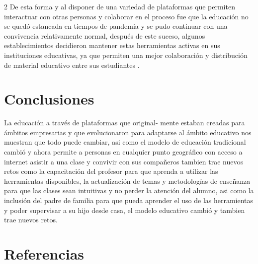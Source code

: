 \documentclass[12pt,spanish,Letterpaper,openany]{book}
\begin{document}
\begin {multicols}{2}
De esta forma y al disponer de una variedad de plataformas que permiten interactuar con
otras personas y colaborar en el proceso fue que la educación no se quedó estancada en
tiempos de pandemia y se pudo continuar con una convivencia relativamente normal, después
de este suceso, algunos establecimientos decidieron mantener estas herramientas activas en
sus instituciones educativas, ya que permiten una mejor colaboración y distribución de
material educativo entre sus estudiantes .

\hypertarget{conclusiones-7}{%
\section{Conclusiones}\label{conclusiones-7}}

La educación a través de plataformas que original-
mente estaban creadas para ámbitos
empresarias y que evolucionaron para adaptarse al ámbito educativo nos muestran que todo
puede cambiar, asi como el modelo de educación tradicional cambió y ahora permite a
personas en cualquier punto geográfico con acceso a internet asistir a una clase y convivir
con sus compañeros tambien trae nuevos retos como la capacitación del profesor para que
aprenda a utilizar las herramientas disponibles, la actualización de temas y metodologías de
enseñanza para que las clases sean intuitivas y no perder la atención del alumno, asi como la
inclusión del padre de familia para que pueda aprender el uso de las herramientas y poder
supervisar a su hijo desde casa, el modelo educativo cambió y tambien trae nuevos retos.

\hypertarget{referencias-7}{%
\section{Referencias}\label{referencias-7}}


\end{multicols}
\end{document}

